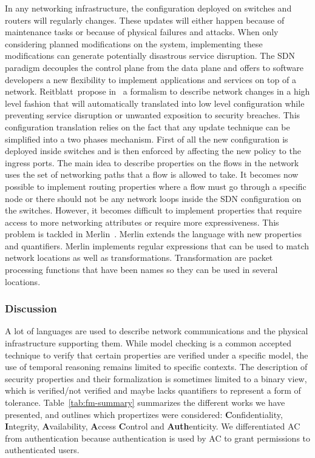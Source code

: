 In any networking infrastructure, the configuration deployed on switches and routers will regularly changes. These updates will either happen because of maintenance tasks or because of physical failures and attacks.
When only considering planned modifications on the system, implementing these modifications can generate potentially disastrous service disruption.
The SDN paradigm decouples the control plane from the data plane and offers to software developers a new flexibility to implement applications and services on top of a network.
Reitblatt~\etal propose in~\cite{abstraction-reitblatt2012} a formalism to describe network changes in a high level fashion that will automatically translated into low level configuration while preventing service disruption or unwanted exposition to security breaches.
This configuration translation relies on the fact that any update technique can be simplified into a two phases mechanism. First of all the new configuration is deployed inside switches and is then enforced by affecting the new policy to the ingress ports.
The main idea to describe properties on the flows in the network uses the set of networking paths that a flow is allowed to take.
It becomes now possible to implement routing properties where a flow must go through a specific node or there should not be any network loops inside the SDN configuration on the switches.
However, it becomes difficult to implement properties that require access to more networking attributes or require more expressiveness. This problem is tackled in Merlin~\cite{Merlin-Soule2013}.
Merlin extends the language with new properties and quantifiers.
Merlin implements regular expressions that can be used to match network locations as well as transformations.
Transformation are packet processing functions that have been names so they can be used in several locations.



\subsubsection{Discussion}

A lot of languages are used to describe network communications and the physical infrastructure supporting them. While model checking is a common accepted technique to verify that certain properties are verified under a specific model, the use of temporal reasoning remains limited to specific contexts.
The description of security properties and their formalization is sometimes limited to a binary view, which is verified/not verified and maybe lacks quantifiers to represent a form of tolerance.
Table~\ref{tab:fm-summary} summarizes the different works we have presented, and outlines which propertizes were considered: \textbf{C}onfidentiality, \textbf{I}ntegrity, \textbf{A}vailability, \textbf{A}ccess \textbf{C}ontrol and \textbf{Auth}enticity. We differentiated AC from authentication because authentication is used by AC to grant permissions to authenticated users.

